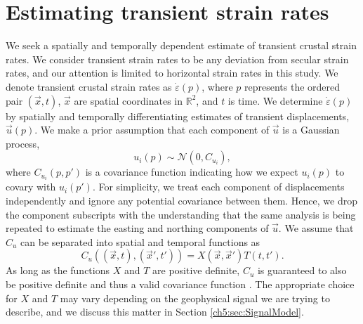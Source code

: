\section{Estimating transient strain rates}\label{ch5:sec:Method}
We seek a spatially and temporally dependent estimate of transient crustal strain rates. We consider transient strain rates to be any deviation from secular strain rates, and our attention is limited to horizontal strain rates in this study. We denote transient crustal strain rates as $\dot\varepsilon(p)$, where $p$ represents the ordered pair $(\vec{x},t)$, $\vec{x}$ are spatial coordinates in $\mathbb{R}^2$, and $t$ is time. We determine $\dot\varepsilon(p)$ by spatially and temporally differentiating estimates of transient displacements, $\vec{u}(p)$. We make a prior assumption that each component of $\vec{u}$ is a Gaussian process,
\begin{equation}\label{ch5:eq:TransientDeformation}
u_i(p) \sim \mathcal{N}\left(0,C_{u_i}\right),
\end{equation}
where $C_{u_i}(p,p')$ is a covariance function indicating how we expect $u_i(p)$ to covary with $u_i(p')$. For simplicity, we treat each component of displacements independently and ignore any potential covariance between them. Hence, we drop the component subscripts with the understanding that the same analysis is being repeated to estimate the easting and northing components of $\vec{u}$. We assume that $C_u$ can be separated into spatial and temporal functions as 
\begin{equation}\label{ch5:eq:TransientCovariance}
C_{u}\left((\vec{x},t),(\vec{x}',t')\right) = X(\vec{x},\vec{x}')T(t,t').
\end{equation}  
As long as the functions $X$ and $T$ are positive definite, $C_u$ is guaranteed to also be positive definite and thus a valid covariance function \citep[sec. 4.2.4]{Rasmussen2006}. The appropriate choice for $X$ and $T$ may vary depending on the geophysical signal we are trying to describe, and we discuss this matter in Section \ref{ch5:sec:SignalModel}.  

